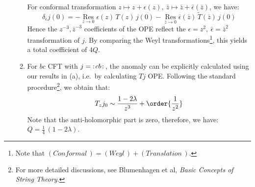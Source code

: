 \documentclass[a4paper,10pt]{article}
\begin{document}
\begin{enumerate}
\begin{enumerate}
	For conformal transformation $
		z\mapsto z + \epsilon(z),\ %
		\bar{z}\mapsto \bar{z}
			+ \bar{\epsilon}(\bar{z})
	$, we have:
	\begin{equation}
		\delta_\epsilon j(0)
		= -\operatorname*{Res}\limits_{z\to 0}
				\epsilon(z)\,
				T(z)\,j(0)
			-\operatorname*{Res}\limits_{\bar{z}\to 0}
				\bar{\epsilon}(\bar{z})\,
				\tilde{T}(\bar{z})\,j(0)
	\end{equation}
	Hence the $z^{-3},\bar{z}^{-3}$ coefficients of the OPE reflect the $
		\epsilon = z^2,\ %
		\bar{\epsilon} = \bar{z}^2
	$ transformation of $j$.  By comparing the Weyl transformations\footnote{
		Note that $
			(\textit{Conformal}\,)
			= (\textit{Weyl}\,)
				+ (\textit{Translation}\,)
		$. 
	}, this yields a total coefficient of $4Q$. 
	
	\item For $bc$ CFT with $j = {\mathopen {:}}{{\hskip .1em} cb{\hskip .1em}}{\mathclose {:}}\,$, the anomaly can be explicitly calculated using our results in (a), i.e.\ by calculating $Tj$ OPE. Following the standard procedure\footnote{
		For more detailed discussions, see Blumenhagen et al, \textit{Basic Concepts of String Theory}. 
	}, we obtain that:
	\begin{equation}
		T_z j_0 \sim \frac{1 - 2\lambda}{z^3}
			+ \order{\frac{1}{z^2}}
	\end{equation}
	Note that the anti-holomorphic part is zero, therefore, we have: $
		Q = \frac{1}{4}\,(1 - 2\lambda)
	$. \qedfull
	
	\end{enumerate}
	
	\end{enumerate}


\printbibliography[%
	,heading = bibintoc
]
\end{document}
